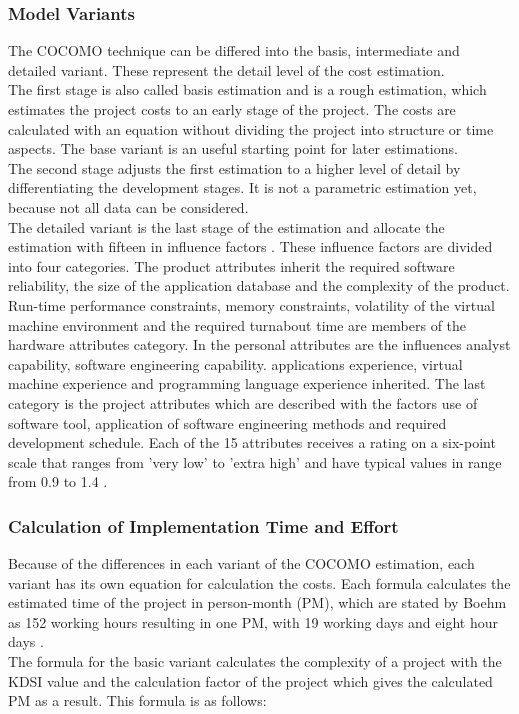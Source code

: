 \subsubsection{Model Variants}

The COCOMO technique can be differed into the basis, intermediate and detailed variant. These represent the detail level of the cost estimation.\\
The first stage is also called basis estimation and is a rough estimation, which estimates the project costs to an early stage of the project. The costs are calculated with an equation without dividing the project into structure or time aspects. The base variant is an useful starting point for later estimations.\\
The second stage adjusts the first estimation to a higher level of detail by differentiating the development stages. It is not a parametric estimation yet, because not all data can be considered.\\
The detailed variant is the last stage of the estimation and allocate the estimation with fifteen in influence factors \cite{jenny}. These influence factors are divided into four categories. The product attributes inherit the required software reliability, the size of the application database and the complexity of the product. Run-time performance constraints, memory constraints, volatility of the virtual machine environment and the required turnabout time are members of the hardware attributes category. In the personal attributes are the influences analyst capability, software engineering capability. applications experience, virtual machine experience and programming language experience inherited. The last category is the project attributes which are described with the factors use of software tool, application of software engineering methods and required development schedule. Each of the 15 attributes receives a rating on a six-point scale that ranges from 'very low' to 'extra high' and have typical values in range from 0.9 to 1.4 .\\

\subsubsection{Calculation of Implementation Time and Effort}

Because of the differences in each variant of the COCOMO estimation, each variant has its own equation for calculation the costs. Each formula calculates the estimated time of the project in person-month (PM), which are stated by Boehm as 152 working hours resulting in one PM, with 19 working days and eight hour days \cite{boehm}. \\
The formula for the basic variant calculates the complexity of a project with the KDSI value and the calculation factor of the project which gives the calculated PM as a result. This formula is as follows:


